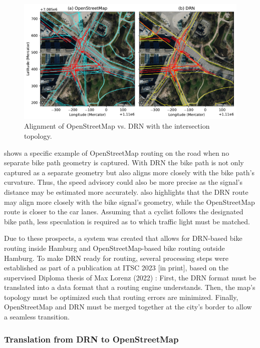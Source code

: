 \begin{figure}[htbp]
\centering
\includegraphics[width=\linewidth]{images/routing-drn-osm-intersection.pdf}
\caption{Alignment of OpenStreetMap vs. DRN with the intersection topology.}
\label{fig:comparison}
\end{figure}

 shows a specific example of OpenStreetMap routing on the road when no separate bike path geometry is captured. With DRN the bike path is not only captured as a separate geometry but also aligns more closely with the bike path's curvature. Thus, the speed advisory could also be more precise as the signal's distance may be estimated more accurately.  also highlights that the DRN route may align more closely with the bike signal's geometry, while the OpenStreetMap route is closer to the car lanes. Assuming that a cyclist follows the designated bike path, less speculation is required as to which traffic light must be matched. 

Due to these prospects, a system was created that allows for DRN-based bike routing inside Hamburg and OpenStreetMap-based bike routing outside Hamburg. To make DRN ready for routing, several processing steps were established as part of a publication at ITSC 2023 [in print], based on the supervised Diploma thesis of Max Lorenz (2022) \cite{lorenz_2022}: First, the DRN format must be translated into a data format that a routing engine understands. Then, the map's topology must be optimized such that routing errors are minimized. Finally, OpenStreetMap and DRN must be merged together at the city's border to allow a seamless transition.

\subsubsection{Translation from DRN to OpenStreetMap}

